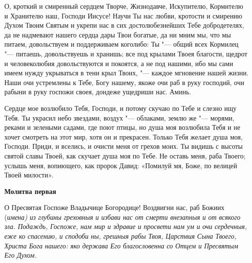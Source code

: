  


О, кроткий и смиренный сердцем Творче, Жизнодавче, Искупителю, Кормителю и Хранителю наш, Господи Иисусе! Научи Ты нас любви, кротости и смирению Духом Твоим Святым и укрепи нас в сих достолюбезнейших Тебе добродетелях, да не надмевают нашего сердца дары Твои богатые, да ни мним мы, что мы питаем, довольствуем и поддерживаем коголибо: Ты "--- общий всех Кормилец "--- питаешь, довольствуешь и хранишь; все под крылами Твоея благости, щедрот и человеколюбия довольствуются и покоятся, а не под нашими, ибо мы сами имеем нужду укрываться в тени крыл Твоих, "--- каждое мгновение нашей жизни. Наши очи устремлены к Тебе, Богу нашему, якоже очи раб в руку господий, очи рабыни в руку госпожи своея, дондеже ущедриши нас. Аминь.
\mychapterending

 


Сердце мое возлюбило Тебя, Господи, и потому скучаю по Тебе и слезно ищу Тебя. Ты украсил небо звездами, воздух "--- облаками, землю же "--- морями, реками и зелеными садами, где поют птицы, но душа моя возлюбила Тебя и не хочет смотреть на этот мир, хотя он и прекрасен. Только Тебя желает душа моя, Господи. Приди, и вселись, и очисти меня от грехов моих. Ты видишь с высоты святой славы Твоей, как скучает душа моя по Тебе. Не оставь меня, раба Твоего; услышь меня, вопиющего, как пророк Давид: «Помилуй мя, Боже, по велицей Твоей милости».
\mychapterending

 


\medskip\bfseries Молитва первая\normalfont{}\nopagebreak


О Пресвятая Госпоже Владычице Богородице! Воздвигни нас, раб Божиих (\itshape имена\normalfont{}) из глубины греховныя и избави нас от смерти внезапныя и от всякого зла. Подаждь, Госпоже, нам мир и здравие и просвети нам ум и очи сердечныя, еже ко спасению, и сподоби ны, грешныя рабы Твоя, Царствия Сына Твоего, Христа Бога нашего: яко держава Его благословенна со Отцем и Пресвятым Его Духом. 


